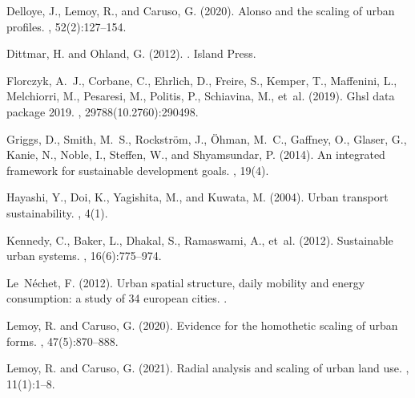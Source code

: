 \documentclass{article}
\begin{document}
\begin{thebibliography}{}

Delloye, J., Lemoy, R., and Caruso, G. (2020).
\newblock Alonso and the scaling of urban profiles.
, 52(2):127--154.

Dittmar, H. and Ohland, G. (2012).
.
\newblock Island Press.

Florczyk, A.~J., Corbane, C., Ehrlich, D., Freire, S., Kemper, T., Maffenini,
  L., Melchiorri, M., Pesaresi, M., Politis, P., Schiavina, M., et~al. (2019).
\newblock Ghsl data package 2019.
, 29788(10.2760):290498.

Griggs, D., Smith, M.~S., Rockstr{\"o}m, J., {\"O}hman, M.~C., Gaffney, O.,
  Glaser, G., Kanie, N., Noble, I., Steffen, W., and Shyamsundar, P. (2014).
\newblock An integrated framework for sustainable development goals.
, 19(4).

Hayashi, Y., Doi, K., Yagishita, M., and Kuwata, M. (2004).
\newblock Urban transport sustainability.
,
  4(1).

Kennedy, C., Baker, L., Dhakal, S., Ramaswami, A., et~al. (2012).
\newblock Sustainable urban systems.
, 16(6):775--974.

Le~N{\'e}chet, F. (2012).
\newblock Urban spatial structure, daily mobility and energy consumption: a
  study of 34 european cities.
.

Lemoy, R. and Caruso, G. (2020).
\newblock Evidence for the homothetic scaling of urban forms.
,
  47(5):870--888.

Lemoy, R. and Caruso, G. (2021).
\newblock Radial analysis and scaling of urban land use.
, 11(1):1--8.


\end{thebibliography}
\end{document}

